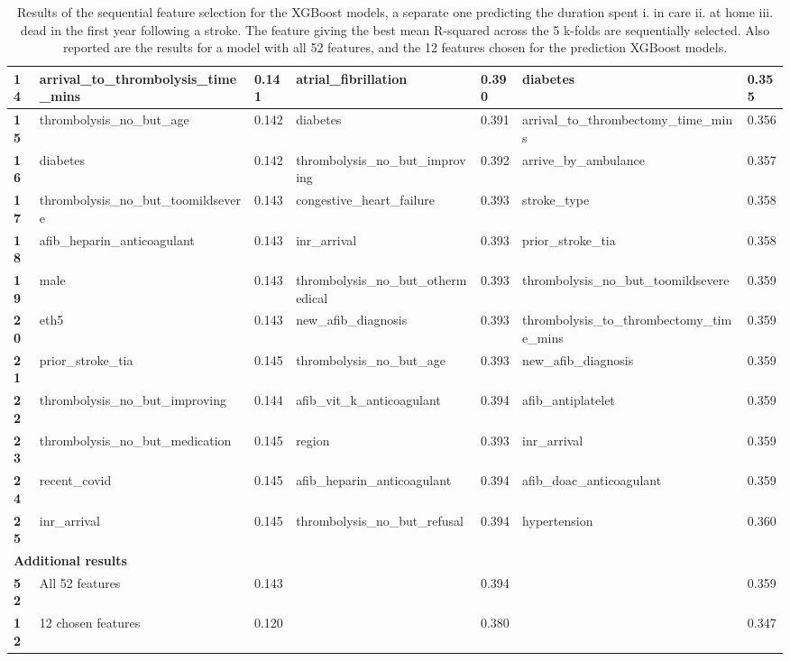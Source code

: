 \begin{landscape}
\begin{table}[!ht]
\begin{tabular}{|l|l|l|l|l|l|l|}
        \bf 14 & arrival\_to\_thrombolysis\_time\_mins & 0.141 & atrial\_fibrillation & 0.390 & diabetes & 0.355 \\ \hline
        \bf 15 & thrombolysis\_no\_but\_age & 0.142 & diabetes & 0.391 & arrival\_to\_thrombectomy\_time\_mins & 0.356 \\ \hline
        \bf 16 & diabetes & 0.142 & thrombolysis\_no\_but\_improving & 0.392 & arrive\_by\_ambulance & 0.357 \\ \hline
        \bf 17 & thrombolysis\_no\_but\_toomildsevere & 0.143 & congestive\_heart\_failure & 0.393 & stroke\_type & 0.358 \\ \hline
        \bf 18 & afib\_heparin\_anticoagulant & 0.143 & inr\_arrival & 0.393 & prior\_stroke\_tia & 0.358 \\ \hline
        \bf 19 & male & 0.143 & thrombolysis\_no\_but\_othermedical & 0.393 & thrombolysis\_no\_but\_toomildsevere & 0.359 \\ \hline
        \bf 20 & eth5 & 0.143 & new\_afib\_diagnosis & 0.393 & thrombolysis\_to\_thrombectomy\_time\_mins & 0.359 \\ \hline
        \bf 21 & prior\_stroke\_tia & 0.145 & thrombolysis\_no\_but\_age & 0.393 & new\_afib\_diagnosis & 0.359 \\ \hline
        \bf 22 & thrombolysis\_no\_but\_improving & 0.144 & afib\_vit\_k\_anticoagulant & 0.394 & afib\_antiplatelet & 0.359 \\ \hline
        \bf 23 & thrombolysis\_no\_but\_medication & 0.145 & region & 0.393 & inr\_arrival & 0.359 \\ \hline
        \bf 24 & recent\_covid & 0.145 & afib\_heparin\_anticoagulant & 0.394 & afib\_doac\_anticoagulant & 0.359 \\ \hline
        \bf 25 & inr\_arrival & 0.145 & thrombolysis\_no\_but\_refusal & 0.394 & hypertension & 0.360 \\ \hline
        \multicolumn{7}{|l|}{\bf Additional results} \\ \hline
        \bf 52 & All 52 features & 0.143 & ~ & 0.394 & ~ & 0.359 \\ \hline
        \bf 12 & 12 chosen features & 0.120 & ~ & 0.380 & ~ & 0.347 \\ \hline
    \end{tabular}
    \caption{Results of the sequential feature selection for the XGBoost models, a separate one predicting the duration spent i. in care ii. at home iii. dead in the first year following a stroke. The feature giving the best mean R-squared across the 5 k-folds are sequentially selected. Also reported are the results for a model with all 52 features, and the 12 features chosen for the prediction XGBoost models.}
    \label{tab:feature-selection}
\end{table}

\end{landscape}


